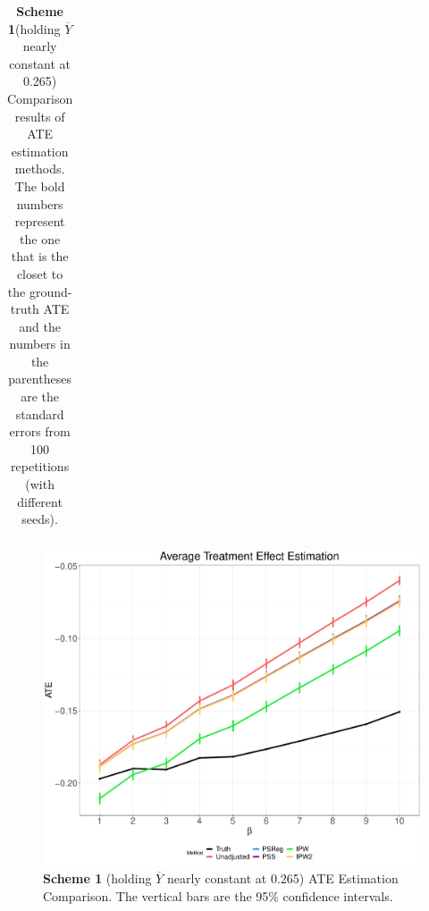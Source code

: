 \documentclass{article}
\begin{document}
\begin{table}[H]
\begin{tabular}{ccccp{15mm}||cp{15mm}p{15mm}p{15mm}p{15mm}p{15mm}}
		\end{tabular}
		\vspace{1em}
		\caption{\textbf{Scheme 1}(holding $\overline{Y}$ nearly constant at 0.265) Comparison results of ATE estimation methods. The bold numbers represent the one that is the closet to the ground-truth ATE and the numbers in the parentheses are the standard errors from 100 repetitions (with different seeds). }
		\label{tab:results}
	\end{table}
	
		
	
	\begin{figure}[H]
		\centering
		\includegraphics[scale=0.5]{../results/ate_results.pdf}
		\caption{\textbf{Scheme 1} (holding $\overline{Y}$ nearly constant at 0.265) ATE Estimation Comparison. The vertical bars are the 95\% confidence intervals. }
		\label{fig:results}
	\end{figure}
\end{document}
